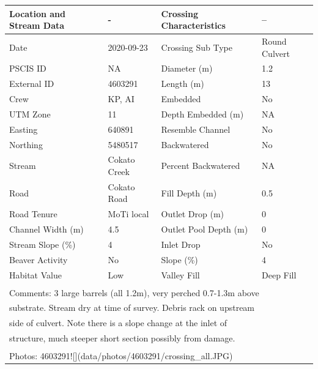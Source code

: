 \documentclass[
]{book}
\begin{document}
\begin{tabular}{llll}
\toprule
Location and Stream Data & - & Crossing Characteristics & --\\
\midrule
Date & 2020-09-23 & Crossing Sub Type & Round Culvert\\
PSCIS ID & NA & Diameter (m) & 1.2\\
External ID & 4603291 & Length (m) & 13\\
Crew & KP, AI & Embedded & No\\
UTM Zone & 11 & Depth Embedded (m) & NA\\
\addlinespace
Easting & 640891 & Resemble Channel & No\\
Northing & 5480517 & Backwatered & No\\
Stream & Cokato Creek & Percent Backwatered & NA\\
Road & Cokato Road & Fill Depth (m) & 0.5\\
Road Tenure & MoTi local & Outlet Drop (m) & 0\\
\addlinespace
Channel Width (m) & 4.5 & Outlet Pool Depth (m) & 0\\
Stream Slope (\%) & 4 & Inlet Drop & No\\
Beaver Activity & No & Slope (\%) & 4\\
Habitat Value & Low & Valley Fill & Deep Fill\\
\bottomrule
\multicolumn{4}{l}{\textsuperscript{} Comments: 3 large barrels (all 1.2m), very perched 0.7-1.3m above}\\
\multicolumn{4}{l}{substrate. Stream dry at time of survey. Debris rack on upstream}\\
\multicolumn{4}{l}{side of culvert. Note there is a slope change at the inlet of}\\
\multicolumn{4}{l}{structure, much steeper short section possibly from damage.}\\
\multicolumn{4}{l}{\textsuperscript{} Photos: 4603291![](data/photos/4603291/crossing\_all.JPG)}\\
\end{tabular}
\end{document}
